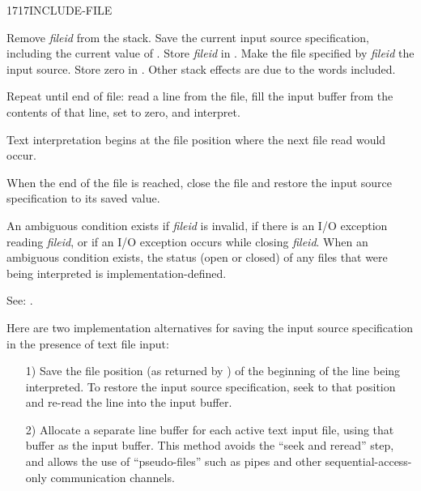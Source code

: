 \begin{newword}{1717}{INCLUDE-FILE}

	Remove \emph{fileid} from the stack. Save the current input
	source specification, including the current value of
	. Store \emph{fileid} in .
	Make the file specified by \emph{fileid} the input source. Store
	zero in . Other stack effects are due to the
	words included.

	Repeat until end of file: read a line from the file, fill the
	input buffer from the contents of that line, set 
	to zero, and interpret.

	Text interpretation begins at the file position where the next
	file read would occur.

	When the end of the file is reached, close the file and restore
	the input source specification to its saved value.

	An ambiguous condition exists if \emph{fileid} is invalid, if
	there is an I/O exception reading \emph{fileid}, or if an I/O
	exception occurs while closing \emph{fileid}. When an ambiguous
	condition exists, the status (open or closed) of any files that
	were being interpreted is implementation-defined.

\item[See:]
	.

	\begin{rationale} %
		Here are two implementation alternatives for saving the input
		source specification in the presence of text file input:

		\begin{enumerate}
		\item[1)] Save the file position (as returned by
			) of the beginning of the line being
			interpreted. To restore the input source specification,
			seek to that position and re-read the line into the input
			buffer.

		\item[2)] Allocate a separate line buffer for each active text
			input file, using that buffer as the input buffer. This
			method avoids the ``seek and reread'' step, and allows the
			use of ``pseudo-files'' such as pipes and other
			sequential-access-only communication channels. 
		\end{enumerate}
	\end{rationale}
\end{newword}



